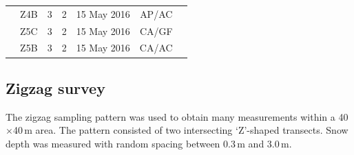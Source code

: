 \documentclass{sfuthesis}
\begin{document}
\begin{table}[]
\begin{tabular}{ccccccl}
                      & Z4B               & 3                                                               & 2                                                                             & 15 May 2016   & AP/AC              &                                                                              \\
                      & Z5C               & 3                                                               & 2                                                                             & 15 May 2016   & CA/GF              &                                                                              \\
                      & Z5B               & 3                                                               & 2                                                                             & 15 May 2016   & CA/AC              &                                                                             
\end{tabular}
\end{table}



\subsection{Zigzag survey}
\label{sec:zigzagmethods}

The zigzag sampling pattern was used to obtain many measurements within a 40$\times$40\,m area.  The pattern consisted of two intersecting `Z'-shaped transects. Snow depth was measured with random spacing between 0.3\,m and 3.0\,m. 
\end{document}
